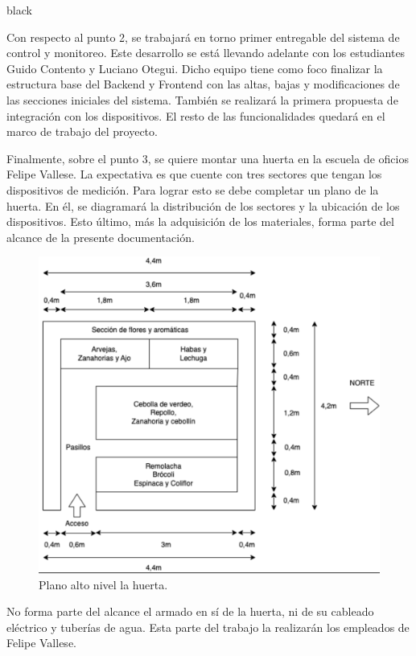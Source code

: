 \documentclass[
11pt, %
codirector, %
]{charter}
\begin{document}
\begin{consigna}{black}

Con respecto al punto 2, se trabajará en torno primer entregable del sistema de control y monitoreo. Este desarrollo se está llevando adelante con los estudiantes Guido Contento y Luciano Otegui. Dicho equipo tiene como foco finalizar la estructura base del Backend y Frontend con las altas, bajas y modificaciones de las secciones iniciales del sistema. También se realizará la primera propuesta de integración con los dispositivos. El resto de las funcionalidades quedará en el marco de trabajo del proyecto.

Finalmente, sobre el punto 3, se quiere montar una huerta en la escuela de oficios Felipe Vallese. La expectativa es que cuente con tres sectores que tengan los dispositivos de medición. Para lograr esto se debe completar un plano de la huerta. En él, se diagramará la distribución de los sectores y la ubicación de los dispositivos. Esto último, más la adquisición de los materiales, forma parte del alcance de la presente documentación.


\begin{figure}[htpb]
\centering 
\includegraphics[width=.7\textwidth]{./Figuras/diagHuerta.png}
\caption{Plano alto nivel la huerta.}
\label{fig:diagHuerta}
\end{figure}

\vspace{25px}

No forma parte del alcance el armado en sí de la huerta, ni de su cableado eléctrico y tuberías de agua. Esta parte del trabajo la realizarán los empleados de Felipe Vallese.

\end{consigna}
\end{document}
